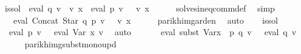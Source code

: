 \begin{isabellebody}
\ is{\isacharunderscore}{\kern0pt}sol{\isacharprime}{\kern0pt}{\isacharcolon}{\kern0pt}\ {\isachardoublequoteopen}{\isasymPsi}\ {\isacharparenleft}{\kern0pt}eval\ q\ v\ {\isacharat}{\kern0pt}{\isacharat}{\kern0pt}\ v\ x\ {\isasymunion}\ eval\ p\ v{\isacharparenright}{\kern0pt}\ {\isasymsubseteq}\ {\isasymPsi}\ {\isacharparenleft}{\kern0pt}v\ x{\isacharparenright}{\kern0pt}{\isachardoublequoteclose}\isanewline
\ \ \ \ \isamarkupfalse%
\ solves{\isacharunderscore}{\kern0pt}ineq{\isacharunderscore}{\kern0pt}comm{\isacharunderscore}{\kern0pt}def\ \isamarkupfalse%
\ simp\isanewline
\ \ \isamarkupfalse%
\ \isamarkupfalse%
\ {}{\isacharcolon}{\kern0pt}\ {\isachardoublequoteopen}{\isasymPsi}\ {\isacharparenleft}{\kern0pt}eval\ {\isacharparenleft}{\kern0pt}Concat\ {\isacharparenleft}{\kern0pt}Star\ q{\isacharparenright}{\kern0pt}\ p{\isacharparenright}{\kern0pt}\ v{\isacharparenright}{\kern0pt}\ {\isasymsubseteq}\ {\isasymPsi}\ {\isacharparenleft}{\kern0pt}v\ x{\isacharparenright}{\kern0pt}{\isachardoublequoteclose}\isanewline
\ \ \ \ \isamarkupfalse%
\ parikh{\isacharunderscore}{\kern0pt}img{\isacharunderscore}{\kern0pt}arden\ \isamarkupfalse%
\ auto\isanewline
\ \ \isamarkupfalse%
\ is{\isacharunderscore}{\kern0pt}sol{\isacharprime}{\kern0pt}\ \isamarkupfalse%
\ {\isachardoublequoteopen}{\isasymPsi}\ {\isacharparenleft}{\kern0pt}eval\ p\ v{\isacharparenright}{\kern0pt}\ {\isasymsubseteq}\ {\isasymPsi}\ {\isacharparenleft}{\kern0pt}eval\ {\isacharparenleft}{\kern0pt}Var\ x{\isacharparenright}{\kern0pt}\ v{\isacharparenright}{\kern0pt}{\isachardoublequoteclose}\ \isamarkupfalse%
\ auto\isanewline
\ \ \isamarkupfalse%
\ \isamarkupfalse%
\ {\isachardoublequoteopen}{\isasymPsi}\ {\isacharparenleft}{\kern0pt}eval\ {\isacharparenleft}{\kern0pt}subst\ {\isacharparenleft}{\kern0pt}Var{\isacharparenleft}{\kern0pt}x\ {\isacharcolon}{\kern0pt}{\isacharequal}{\kern0pt}\ p{\isacharparenright}{\kern0pt}{\isacharparenright}{\kern0pt}\ q{\isacharparenright}{\kern0pt}\ v{\isacharparenright}{\kern0pt}\ {\isasymsubseteq}\ {\isasymPsi}\ {\isacharparenleft}{\kern0pt}eval\ q\ v{\isacharparenright}{\kern0pt}{\isachardoublequoteclose}\isanewline
\ \ \ \ \isamarkupfalse%
\ parikh{\isacharunderscore}{\kern0pt}img{\isacharunderscore}{\kern0pt}subst{\isacharunderscore}{\kern0pt}mono{\isacharunderscore}{\kern0pt}upd\ \isamarkupfalse%

\end{isabellebody}
